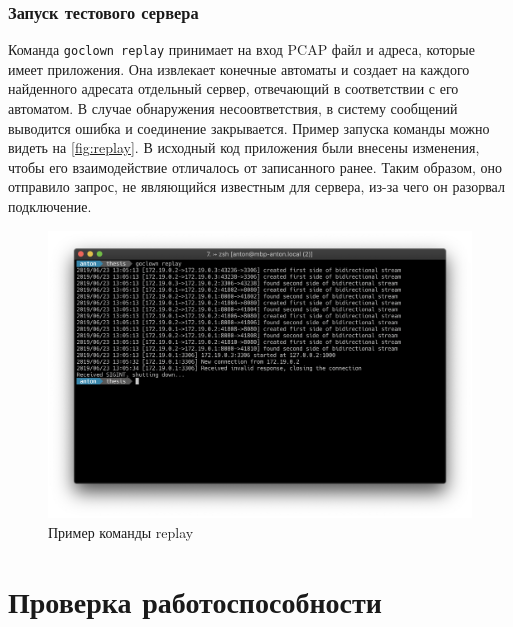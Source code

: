 \subsubsection{Запуск тестового сервера}
Команда \lstinline{goclown replay} принимает на вход PCAP файл и адреса, которые
имеет приложения. Она извлекает конечные автоматы и создает на каждого
найденного адресата отдельный сервер, отвечающий в соответствии с его автоматом.
В случае обнаружения несоовтветствия, в систему сообщений выводится ошибка и
соединение закрывается. Пример запуска команды можно видеть на
\autoref{fig:replay}. В исходный код приложения были внесены изменения, чтобы
его взаимодействие отличалось от записанного ранее. Таким образом, оно отправило
запрос, не являющийся известным для сервера, из-за чего он разорвал подключение.

\begin{figure}[H]
\includegraphics[width=\textwidth,height=\textheight,keepaspectratio]
    {img/replay.png}
\caption{Пример команды replay}
\label{fig:replay}
\end{figure}


\pagebreak

\section{Проверка работоспособности}
